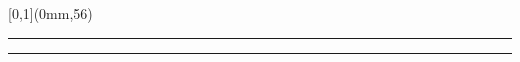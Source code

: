 
\begingroup
{}
\textblockorigin{0mm}{0mm}
\setlength{\parindent}{0mm}
\setlength{\bandeorwidth}{12.8125\TPVertModule} %
\setlength{\banderougewidth}{\paperwidth}
\addtolength{\banderougewidth}{-\bandeorwidth}
\setlength{\bandeorheight}{\TPVertModule}
\setlength{\banderougeheight}{\TPVertModule}

\begin{textblock*}{\paperwidth}[0,1](0mm,56\TPVertModule)
  \textcolor{or}{\rule{\bandeorwidth}{\TPVertModule}}%
  \textcolor{rouge}{\rule{\banderougewidth}{\TPVertModule}} %
\end{textblock*}
\endgroup

